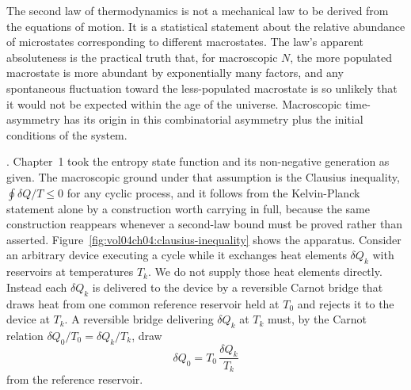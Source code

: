 \begin{principle}
The second law of thermodynamics is not a mechanical law to be
derived from the equations of motion. It is a statistical statement
about the relative abundance of microstates corresponding to
different macrostates. The law's apparent absoluteness is the
practical truth that, for macroscopic $N$, the more populated
macrostate is more abundant by exponentially many factors, and any
spontaneous fluctuation toward the less-populated macrostate is so
unlikely that it would not be expected within the age of the
universe. Macroscopic time-asymmetry has its origin in this
combinatorial asymmetry plus the initial conditions of the system.
\end{principle}

. Chapter~1 took the
entropy state function and its non-negative generation as given. The
macroscopic ground under that assumption is the Clausius inequality,
$\oint \delta Q/T \le 0$ for any cyclic process, and it follows from
the Kelvin-Planck statement alone by a construction worth carrying in
full, because the same construction reappears whenever a second-law
bound must be proved rather than asserted.
Figure~\ref{fig:vol04ch04:clausius-inequality} shows the apparatus.
Consider an arbitrary device executing a cycle while it exchanges heat
elements $\delta Q_k$ with reservoirs at temperatures $T_k$. We do not
supply those heat elements directly. Instead each $\delta Q_k$ is
delivered to the device by a reversible Carnot bridge that draws heat
from one common reference reservoir held at $T_0$ and rejects it to the
device at $T_k$. A reversible bridge delivering $\delta Q_k$ at $T_k$
must, by the Carnot relation $\delta Q_0/T_0 = \delta Q_k/T_k$, draw
\[
\delta Q_0 = T_0\,\frac{\delta Q_k}{T_k}
\]
from the reference reservoir.

